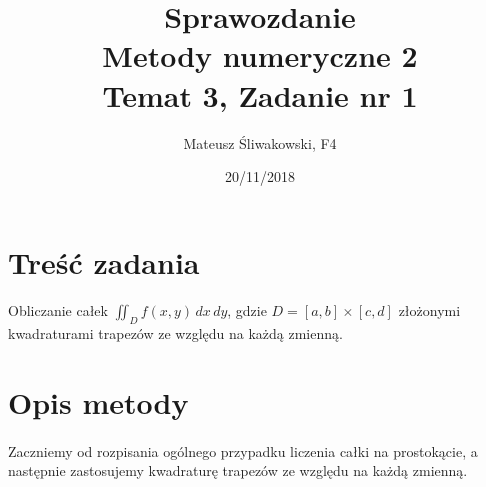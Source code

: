 \documentclass{article}
\title{Sprawozdanie \\Metody numeryczne 2 \\\textbf{Temat 3, Zadanie nr 1}}
\date{20/11/2018}
\author{Mateusz Śliwakowski, F4}
\begin{document}
  \maketitle
 	  \newpage

\section{Treść zadania}
\paragraph{}
Obliczanie całek $\iint_D f(x,y) \,dx\,dy$, gdzie $D = [a,b]\times[c,d]$ złożonymi kwadraturami trapezów ze względu na każdą zmienną.
\section{Opis metody}
\paragraph{}
Zaczniemy od rozpisania ogólnego przypadku liczenia całki na prostokącie, a następnie zastosujemy kwadraturę trapezów ze względu na każdą zmienną.
\end{document}
